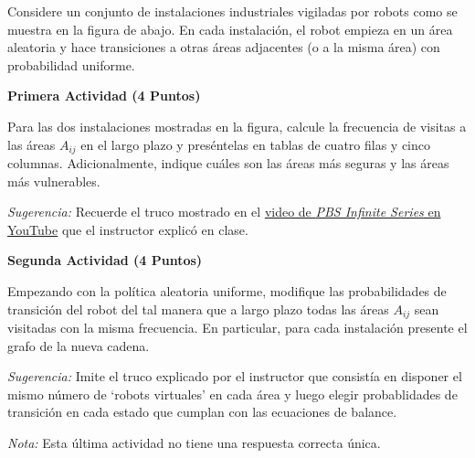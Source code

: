 \documentclass[ a4paper, twoside, 11pt]{article}
\begin{document}
\vspace{\baselineskip}

\begin{problem}
Considere un conjunto de instalaciones industriales vigiladas por robots como se muestra en la figura de abajo. En cada instalaci\'on, el robot empieza en un \'area aleatoria y hace transiciones a otras \'areas adjacentes (o a la misma \'area) con probabilidad uniforme. 

\begin{figure}[htb]
\centering
\def\svgwidth{0.9\columnwidth}

\end{figure}
\halfskip

\textbf{Primera Actividad (4 Puntos)}

Para las dos instalaciones mostradas en la figura, calcule la frecuencia de visitas a las \'areas $A_{ij}$ \linebreak en el largo plazo y pres\'entelas en tablas de cuatro filas y cinco columnas. Adicionalmente, indique cu\'ales son las \'areas m\'as seguras y las \'areas m\'as vulnerables. 

\emph{Sugerencia:} Recuerde el truco mostrado en el \href{https://www.youtube.com/watch?v=63HHmjlh794&list=PLhfK9LVRQ8ywzGXyQDIvH4_XBIcrPp89r}{video de \emph{PBS Infinite Series} en YouTube} que el instructor explic\'o en clase. 
\halfskip

\textbf{Segunda Actividad (4 Puntos)}

Empezando con la pol\'itica aleatoria uniforme, modifique las probabilidades de transici\'on del robot del tal manera que a largo plazo todas las \'areas $A_{ij}$ sean visitadas con la misma frecuencia. En particular, para cada instalaci\'on presente el grafo de la nueva cadena. 

\emph{Sugerencia:} Imite el truco explicado por el instructor que consist\'ia en disponer el mismo n\'umero de `robots virtuales' en cada \'area y luego elegir probablidades de transici\'on en cada estado que cumplan con las ecuaciones de balance. 

\emph{Nota:} Esta \'ultima actividad no tiene una respuesta correcta \'unica. 

\end{problem}
\vspace{\baselineskip}
\end{document}
